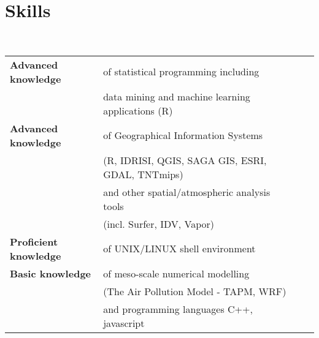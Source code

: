 \documentclass[a4paper,11pt]{article}
\begin{document}
\pagebreak{}
\section{Skills}
\hrulefill \\
\begin{tabular}{llll} \\
\textbf{Advanced knowledge} & of statistical programming including \\
							& data mining and machine learning applications (R)\\
\textbf{Advanced knowledge} & of Geographical Information Systems\\
				   & (R, IDRISI, QGIS, SAGA GIS, ESRI, GDAL, TNTmips)\\
				   & and other spatial/atmospheric analysis tools\\
				   & (incl. Surfer, IDV, Vapor)\\
\textbf{Proficient knowledge} & of UNIX/LINUX shell environment\\
\textbf{Basic knowledge} & of meso-scale numerical modelling\\
				   & (The Air Pollution Model - TAPM, WRF)\\
				   & and programming languages C++, javascript\\
\end{tabular}
\linebreak{}
\end{document}
